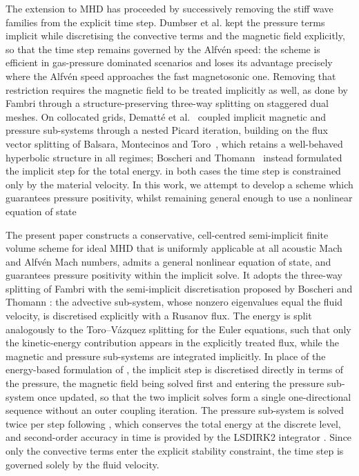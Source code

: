 \documentclass[a4paper,fleqn]{cas-sc}
\theoremstyle{definition}
\theoremstyle{remark}
\begin{document}
The extension to MHD has proceeded by successively removing the stiff wave families
from the explicit time step. Dumbser et al. \cite{Dumbser2019} kept the pressure terms
implicit while discretising the convective terms and the magnetic field explicitly, so
that the time step remains governed by the Alfv\'en speed: the scheme is efficient in
gas-pressure dominated scenarios and loses its advantage precisely where the Alfv\'en
speed approaches the fast magnetosonic one. Removing that restriction requires the
magnetic field to be treated implicitly as well, as done by Fambri \cite{Fambri2021}
through a structure-preserving three-way splitting on staggered dual meshes.
 On collocated grids, Dematt\'e et al.~\cite{Dematte2024} coupled implicit magnetic and
pressure sub-systems through a nested Picard iteration, building on the flux vector
splitting of Balsara, Montecinos and Toro~\cite{BalsaraMontecinosToro2016}, which
retains a well-behaved hyperbolic structure in all regimes; Boscheri and
Thomann~\cite{BoscheriThomann2024} instead formulated the implicit step for the total
energy. in both cases the time step is constrained only by the material
velocity. In this work, we attempt to develop a scheme which guarantees pressure positivity, whilst remaining general enough to use a nonlinear equation of state

The present paper constructs a conservative, cell-centred semi-implicit finite volume
scheme for ideal MHD that is uniformly applicable at all acoustic Mach and Alfv\'en Mach numbers,
admits a general nonlinear equation of state, and guarantees pressure positivity
within the implicit solve. It adopts the three-way splitting of Fambri
\cite{Fambri2021} with the semi-implicit discretisation proposed by Boscheri and Thomann \cite{BoscheriThomann2024}: the advective sub-system, whose nonzero eigenvalues equal the fluid velocity, is
discretised explicitly with a Rusanov flux. The energy is split analogously to the
Toro--V\'azquez splitting for the Euler equations, such that only the kinetic-energy
contribution appears in the explicitly treated flux, while the magnetic and pressure
sub-systems are integrated implicitly. In place of the energy-based formulation of
\cite{BoscheriThomann2024}, the implicit step is discretised directly in terms of the
pressure, the magnetic field being solved first and entering the pressure sub-system
once updated, so that the two implicit solves form a single one-directional sequence
without an outer coupling iteration. The pressure sub-system is solved twice per step
following \cite{FVVEM}, which conserves the total energy at the discrete level, and
second-order accuracy in time is provided by the LSDIRK2 integrator
\cite{LSDIRK2}. Since only the convective terms enter the explicit stability
constraint, the time step is governed solely by the fluid velocity.
\end{document}
